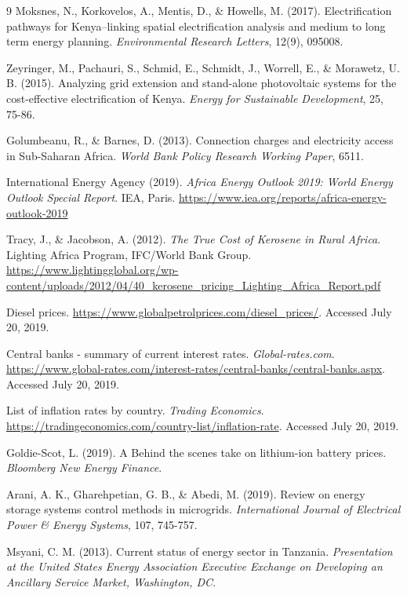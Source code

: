 \documentclass[final,3p,times]{elsarticle}
\begin{document}
\begin{thebibliography}{9}
Moksnes, N., Korkovelos, A., Mentis, D., \& Howells, M. (2017). Electrification pathways for Kenya–linking spatial electrification analysis and medium to long term energy planning. \textit{Environmental Research Letters}, 12(9), 095008.

Zeyringer, M., Pachauri, S., Schmid, E., Schmidt, J., Worrell, E., \& Morawetz, U. B. (2015). Analyzing grid extension and stand-alone photovoltaic systems for the cost-effective electrification of Kenya. \textit{Energy for Sustainable Development}, 25, 75-86.

Golumbeanu, R., \& Barnes, D. (2013). Connection charges and electricity access
in Sub-Saharan Africa. \textit{World Bank Policy Research Working Paper}, 6511.

International Energy Agency (2019). \textit{Africa Energy Outlook 2019: World
Energy Outlook Special Report}. IEA, Paris.
\url{https://www.iea.org/reports/africa-energy-outlook-2019}

Tracy, J., \& Jacobson, A. (2012). \textit{The True Cost of Kerosene in Rural
Africa}. Lighting Africa Program, IFC/World Bank Group.
\url{https://www.lightingglobal.org/wp-content/uploads/2012/04/40_kerosene_pricing_Lighting_Africa_Report.pdf}

Diesel prices. \url{https://www.globalpetrolprices.com/diesel_prices/}. Accessed July 20, 2019.

Central banks - summary of current interest rates. \textit{Global-rates.com}. \url{https://www.global-rates.com/interest-rates/central-banks/central-banks.aspx}. Accessed July 20, 2019.

List of inflation rates by country. \textit{Trading Economics}.
\url{https://tradingeconomics.com/country-list/inflation-rate}. Accessed July 20, 2019.

Goldie-Scot, L. (2019). A Behind the scenes take on lithium-ion battery prices. \textit{Bloomberg New Energy Finance}.

Arani, A. K., Gharehpetian, G. B., \& Abedi, M. (2019). Review on energy storage systems control methods in microgrids. \textit{International Journal of Electrical Power \& Energy Systems}, 107, 745-757.

Msyani, C. M. (2013). Current status of energy sector in Tanzania. \textit{Presentation at the United States Energy Association Executive Exchange on Developing an Ancillary Service Market, Washington, DC}.


\end{thebibliography}
\end{document}
